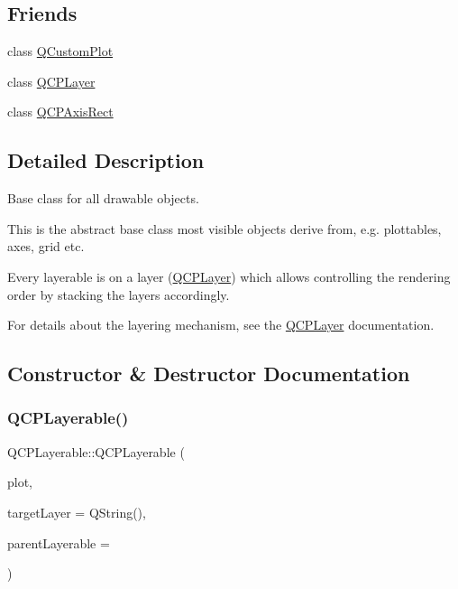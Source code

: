 \subsection*{Friends}
\begin{DoxyCompactItemize}
\item 
class \hyperlink{class_q_c_p_layerable_a1cdf9df76adcfae45261690aa0ca2198}{Q\+Custom\+Plot}
\item 
class \hyperlink{class_q_c_p_layerable_a5dbf96bf7664c1b6fce49063eeea6eef}{Q\+C\+P\+Layer}
\item 
class \hyperlink{class_q_c_p_layerable_acbf20ecb140f66c5fd1bc64ae0762990}{Q\+C\+P\+Axis\+Rect}
\end{DoxyCompactItemize}


\subsection{Detailed Description}
Base class for all drawable objects. 

This is the abstract base class most visible objects derive from, e.\+g. plottables, axes, grid etc.

Every layerable is on a layer (\hyperlink{class_q_c_p_layer}{Q\+C\+P\+Layer}) which allows controlling the rendering order by stacking the layers accordingly.

For details about the layering mechanism, see the \hyperlink{class_q_c_p_layer}{Q\+C\+P\+Layer} documentation. 

\subsection{Constructor \& Destructor Documentation}
\mbox{\label{class_q_c_p_layerable_a74c0fa237f29bf0e49565013fc5d1ec0}} 
\subsubsection{\texorpdfstring{Q\+C\+P\+Layerable()}{QCPLayerable()}}
{\footnotesize\ttfamily Q\+C\+P\+Layerable\+::\+Q\+C\+P\+Layerable (\begin{DoxyParamCaption}\item[{\hyperlink{class_q_custom_plot}{Q\+Custom\+Plot} $\ast$}]{plot,  }\item[{Q\+String}]{target\+Layer = {\ttfamily QString()},  }\item[{\hyperlink{class_q_c_p_layerable}{Q\+C\+P\+Layerable} $\ast$}]{parent\+Layerable = {} }\end{DoxyParamCaption})}


